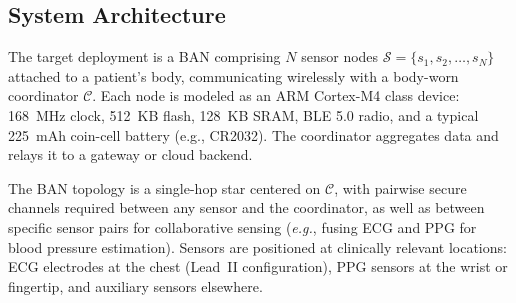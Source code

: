 \documentclass[sensors,article,submit,pdftex,moreauthors]{Definitions/mdpi}
\newcommand{\eg}{\textit{e.g.}}
\begin{document}
\subsection{System Architecture}
\label{subsec:architecture}

The target deployment is a BAN comprising $N$ sensor nodes $\mathcal{S} = \{s_1, s_2, \ldots, s_N\}$ attached to a patient's body, communicating wirelessly with a body-worn coordinator $\mathcal{C}$. Each node is modeled as an ARM Cortex-M4 class device: 168~MHz clock, 512~KB flash, 128~KB SRAM, BLE 5.0 radio, and a typical 225~mAh coin-cell battery (e.g., CR2032). The coordinator aggregates data and relays it to a gateway or cloud backend.

The BAN topology is a single-hop star centered on $\mathcal{C}$, with pairwise secure channels required between any sensor and the coordinator, as well as between specific sensor pairs for collaborative sensing (\eg, fusing ECG and PPG for blood pressure estimation). Sensors are positioned at clinically relevant locations: ECG electrodes at the chest (Lead~II configuration), PPG sensors at the wrist or fingertip, and auxiliary sensors elsewhere.
\end{document}

